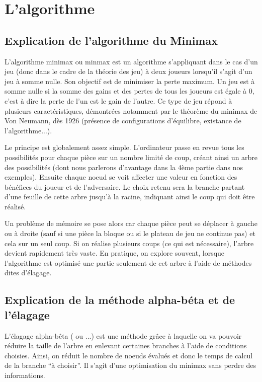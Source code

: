 \documentclass[12,french]{report}
\begin{document}
\chapter{L'algorithme}

\section{Explication de l'algorithme du Minimax }

L'algorithme minimax ou minmax est un algorithme s'appliquant dans
le cas d'un jeu (donc dans le cadre de la théorie des jeu) à deux
joueurs lorsqu'il s'agit d'un jeu à somme nulle. Son objectif est
de minimiser la perte maximum. Un jeu est à somme nulle si la somme
des gains et des pertes de tous les joueurs est égale à 0, c'est à
dire la perte de l'un est le gain de l'autre. Ce type de jeu répond
à plusieurs caractéristiques, démontrées notamment par le théorème
du minimax de Von Neumann, dès 1926 (présence de configurations d'équilibre,
existance de l'algorithme...).

Le principe est globalement assez simple. L'ordinateur passe en revue
tous les possibilités pour chaque pièce sur un nombre limité de coup,
créant ainsi un arbre des possibilités (dont nous parlerons d'avantage
dans la 4ème partie dans nos exemples). Ensuite chaque noeud se voit
affecter une valeur en fonction des bénéfices du joueur et de l'adversaire.
Le choix retenu sera la branche partant d'une feuille de cette arbre
jusqu'à la racine, indiquant ainsi le coup qui doit être réalisé. 

Un problème de mémoire se pose alors car chaque pièce peut se déplacer
à gauche ou à droite (sauf si une pièce la bloque ou si le plateau
de jeu ne continue pas) et cela sur un seul coup. Si on réalise plusieurs
coups (ce qui est nécessaire), l'arbre devient rapidement très vaste.
En pratique, on explore souvent, lorsque l'algorithme est optimisé
une partie seulement de cet arbre à l'aide de méthodes dites d'élagage.

\section{Explication de la méthode alpha-béta et de l'élagage}

L'élagage alpha-bêta ( ou ...) est une méthode grâce à laquelle on
va pouvoir réduire la taille de l'arbre en enlevant certaines branches
à l'aide de conditions choisies. Ainsi, on réduit le nombre de noeuds
évalués et donc le temps de calcul de la branche ``à choisir''.
Il s'agit d'une optimisation du minimax sans perdre des informations. 
\end{document}
